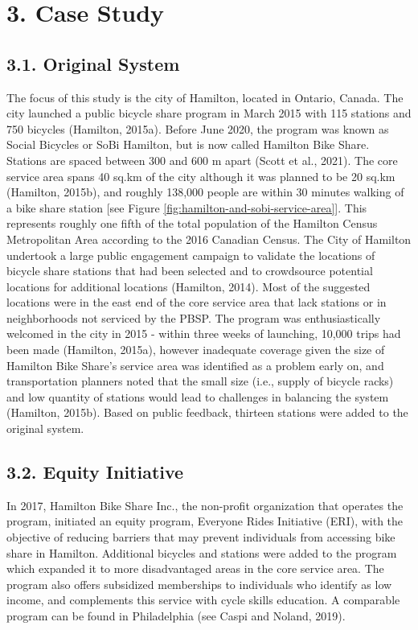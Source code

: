 \documentclass[]{elsarticle} %
\begin{document}
\hypertarget{sec:study}{%
\section{3. Case Study}\label{sec:study}}

\hypertarget{original-system}{%
\subsection{3.1. Original System}\label{original-system}}

The focus of this study is the city of Hamilton, located in Ontario,
Canada. The city launched a public bicycle share program in March 2015
with 115 stations and 750 bicycles (Hamilton, 2015a). Before June 2020,
the program was known as Social Bicycles or SoBi Hamilton, but is now
called Hamilton Bike Share. Stations are spaced between 300 and 600 m
apart (Scott et al., 2021). The core service area spans 40 sq.km of the
city although it was planned to be 20 sq.km (Hamilton, 2015b), and
roughly 138,000 people are within 30 minutes walking of a bike share
station {[}see Figure \ref{fig:hamilton-and-sobi-service-area}{]}. This
represents roughly one fifth of the total population of the Hamilton
Census Metropolitan Area according to the 2016 Canadian Census. The City
of Hamilton undertook a large public engagement campaign to validate the
locations of bicycle share stations that had been selected and to
crowdsource potential locations for additional locations (Hamilton,
2014). Most of the suggested locations were in the east end of the core
service area that lack stations or in neighborhoods not serviced by the
PBSP. The program was enthusiastically welcomed in the city in 2015 -
within three weeks of launching, 10,000 trips had been made (Hamilton,
2015a), however inadequate coverage given the size of Hamilton Bike
Share's service area was identified as a problem early on, and
transportation planners noted that the small size (i.e., supply of
bicycle racks) and low quantity of stations would lead to challenges in
balancing the system (Hamilton, 2015b). Based on public feedback,
thirteen stations were added to the original system.

\hypertarget{equity-initiative}{%
\subsection{3.2. Equity Initiative}\label{equity-initiative}}

In 2017, Hamilton Bike Share Inc., the non-profit organization that
operates the program, initiated an equity program, Everyone Rides
Initiative (ERI), with the objective of reducing barriers that may
prevent individuals from accessing bike share in Hamilton. Additional
bicycles and stations were added to the program which expanded it to
more disadvantaged areas in the core service area. The program also
offers subsidized memberships to individuals who identify as low income,
and complements this service with cycle skills education. A comparable
program can be found in Philadelphia (see Caspi and Noland, 2019).
\end{document}
